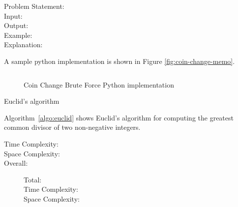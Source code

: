 \begin{description}
    \item[Problem Statement:]
        
    \item[Input:] 
        
    \item[Output:] 
        
    \item[Example:]
        

    \item[Explanation:]
        
\end{description}

A sample python implementation is shown in Figure \ref{fig:coin-change-memo}.

\begin{figure}[H]
    \centering
    \begin{lstlisting}

    \end{lstlisting}
    \caption{Coin Change Brute Force Python implementation}
    \label{fig:coin-change-bf}
\end{figure}


\begin{algorithm}
    \caption{Euclid's algorithm}
    \label{algo:euclid}
\end{algorithm}

Algorithm~\ref{algo:euclid} shows Euclid's algorithm for computing the greatest common divisor of two non-negative integers.


\begin{description}
    \item[Time Complexity:]
        
        
    \item[Space Complexity:] 
        
        
    \item[Overall:] Total:\\
        Time Complexity:\\
        Space Complexity:
    
\end{description}